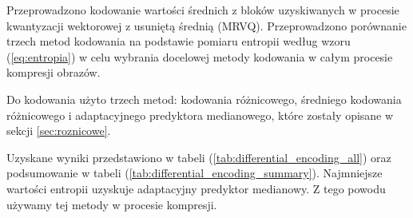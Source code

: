 \documentclass{article}
\begin{document}


Przeprowadzono kodowanie wartości średnich z bloków uzyskiwanych w procesie kwantyzacji wektorowej z usuniętą średnią (MRVQ). Przeprowadzono porównanie trzech metod kodowania na podstawie pomiaru entropii według wzoru (\ref{eq:entropia}) w celu wybrania docelowej metody kodowania w całym procesie kompresji obrazów.

Do kodowania użyto trzech metod: kodowania różnicowego, średniego kodowania różnicowego i adaptacyjnego predyktora medianowego, które zostały opisane w sekcji \ref{sec:roznicowe}.

Uzyskane wyniki przedstawiono w tabeli (\ref{tab:differential_encoding_all}) oraz podsumowanie w tabeli (\ref{tab:differential_encoding_summary}). Najmniejsze wartości entropii uzyskuje adaptacyjny predyktor medianowy.
Z tego powodu używamy tej metody w procesie kompresji.
\end{document}

